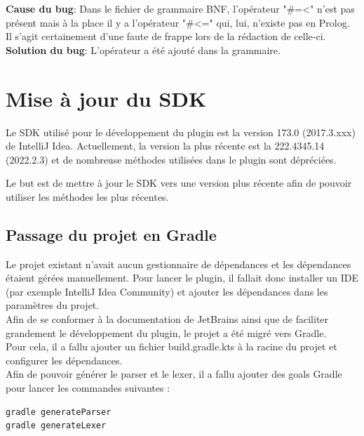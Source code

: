 \noindent \textbf{Cause du bug}: Dans le fichier de grammaire BNF, l'opérateur "\#=<" n'est pas présent mais à la place il y a l'opérateur "\#<=" qui, lui, n'existe pas en Prolog.
Il s'agit certainement d'une faute de frappe lors de la rédaction de celle-ci.
\\
\textbf{Solution du bug}: L'opérateur a été ajouté dans la grammaire.

\section{Mise à jour du SDK}
\noindent
Le SDK utilisé pour le développement du plugin est la version 173.0 (2017.3.xxx) de IntelliJ Idea.
Actuellement, la version la plus récente est la 222.4345.14 (2022.2.3) et de nombreuse méthodes utilisées dans le plugin sont dépréciées.

Le but est de mettre à jour le SDK vers une version plus récente afin de pouvoir utiliser les méthodes les plus récentes.

\subsection{Passage du projet en Gradle}
\noindent
Le projet existant n'avait aucun gestionnaire de dépendances et les dépendances étaient gérées manuellement.
Pour lancer le plugin, il fallait donc installer un IDE (par exemple IntelliJ Idea Community) et ajouter les dépendances dans les paramètres du projet.
\\ \noindent Afin de se conformer à la documentation de JetBrains ainsi que de faciliter grandement le développement du plugin, le projet a été migré vers Gradle.
\\\noindent Pour cela, il a fallu ajouter un fichier build.gradle.kts à la racine du projet et configurer les dépendances.
\\ \noindent Afin de pouvoir générer le parser et le lexer, il a fallu ajouter des goals Gradle pour lancer les commandes suivantes :
\begin{lstlisting}
gradle generateParser
gradle generateLexer
\end{lstlisting}


